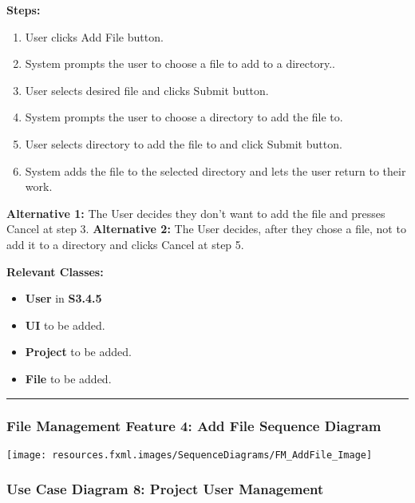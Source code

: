 \documentclass[twoside,letterpaper]{article}
\begin{document}
\noindent\textbf{Steps:} \begin{enumerate}
	\item User clicks Add File button.
	\item System prompts the user to choose a file to add to a directory..
	\item User selects desired file and clicks Submit button.
	\item System prompts the user to choose a directory to add the file to.
	\item User selects directory to add the file to and click Submit button.
	\item System adds the file to the selected directory and lets the user return to their work.

\end{enumerate}
\noindent\textbf{Alternative 1:} The User decides they don't want to add the file and presses Cancel at step 3. \newline
\noindent\textbf{Alternative 2:} The User decides, after they chose a file, not to add it to a directory and clicks Cancel at step 5. \newline

\noindent\textbf{Relevant Classes:}
\begin{itemize}
	\item \textbf{User} in \textbf{S3.4.5}
	\item \textbf{UI} to be added.
	\item \textbf{Project} to be added.
	\item \textbf{File} to be added.
\end{itemize}
\vspace{8pt}
\hrule
\bigskip

\newpage

\subsubsection[File Management Feature 4: Add File Sequence Diagram]{\rmfamily\bfseries\color{black}
	File Management Feature 4: Add File Sequence Diagram}
\hypertarget{RefHeading22059017292}{}

\texttt{[image: resources.fxml.images/SequenceDiagrams/FM\_AddFile\_Image]}

\newpage

\subsubsection[Use Case Diagram 8: Project User Management]{\rmfamily\bfseries\color{black}
	Use Case Diagram 8: Project User Management}
\end{document}
